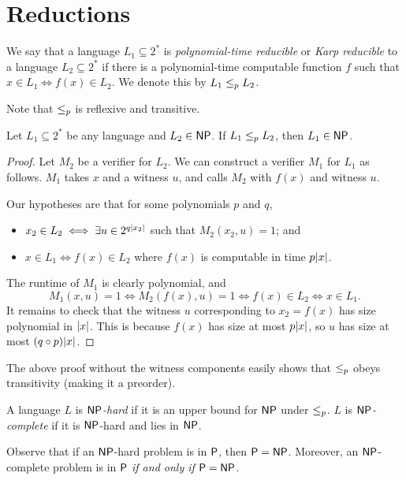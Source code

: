 \section{Reductions} \label{sec:reductions}

\begin{definition} \label{def:karp-reduction}
    We say that a language $L_1 \subseteq 2^*$ is \emph{polynomial-time
    reducible} or \emph{Karp reducible} to a language $L_2 \subseteq 2^*$
    if there is a polynomial-time computable function $f$ such that
    $x \in L_1 \iff f(x) \in L_2$.
    We denote this by $L_1 \lep L_2$.
\end{definition}
Note that $\lep$ is reflexive and transitive.

\begin{exercise}
    Let $L_1 \subseteq 2^*$ be any language and $L_2 \in \NP$.
    If $L_1 \lep L_2$, then $L_1 \in \NP$.
\end{exercise}
\begin{proof}
    Let $M_2$ be a verifier for $L_2$.
    We can construct a verifier $M_1$ for $L_1$ as follows.
    $M_1$ takes $x$ and a witness $u$, and calls $M_2$ with $f(x)$ and
    witness $u$.

    Our hypotheses are that for some polynomials $p$ and $q$,
    \begin{itemize}
        \item $x_2 \in L_2 \iff \exists u \in 2^{q\abs{x_2}}$ such that
            $M_2(x_2, u) = 1$; and
        \item $x \in L_1 \iff f(x) \in L_2$ where $f(x)$ is computable in
            time $p\abs{x}$.
    \end{itemize}
    The runtime of $M_1$ is clearly polynomial, and \[
        M_1(x, u) = 1 \iff M_2(f(x), u) = 1
            \iff f(x) \in L_2 \iff x \in L_1.
    \] It remains to check that the witness $u$ corresponding to
    $x_2 = f(x)$ has size polynomial in $\abs{x}$.
    This is because $f(x)$ has size at most $p\abs{x}$, so $u$ has size
    at most $(q \circ p)\abs{x}$.
\end{proof}
The above proof without the witness components easily shows that
$\lep$ obeys transitivity (making it a preorder).

\begin{definition}[$\NP$-hardness] \label{def:NP-hard}
    A language $L$ is \emph{$\NP$-hard} if it is an upper bound for
    $\NP$ under $\lep$.
    $L$ is \emph{$\NP$-complete} if it is $\NP$-hard and lies in $\NP$.
\end{definition}
Observe that if an $\NP$-hard problem is in $\P$, then $\P = \NP$.
Moreover, an $\NP$-complete problem is in $\P$ \emph{if and only if}
$\P = \NP$.


